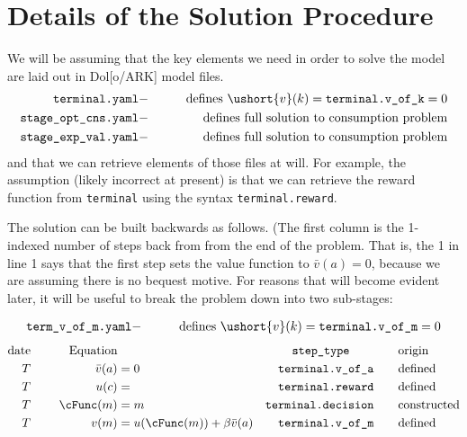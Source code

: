 \documentclass[\econtexRoot/BufferStockTheory]{subfiles}
\newcommand{\EOP}{\bar}
\newcommand{\MOP}{}
\newcommand{\BOP}{\ushort}
\begin{document}

\section{Details of the Solution Procedure}\label{sec:ApndxSolutionSteps}

\makeatletter
\newcommand{\leqnomode}{\tagsleft@true}
\newcommand{\reqnomode}{\tagsleft@false}
\renewcommand\tagform@[1]{\maketag@@@{\ignorespaces#1\unskip\@@italiccorr}}
\makeatother
\leqnomode
\small

We will be assuming that the key elements we need in order to solve the model are laid out in Dol[o/ARK] model files.
\begin{align*}
  \texttt{terminal.yaml} & - & \qquad \text{defines }\BOP{v}(k)=\texttt{terminal.v\_of\_k}=0
 \\ \texttt{stage\_opt\_cns.yaml} & - & \qquad \text{defines full solution to consumption problem}
 \\ \texttt{stage\_exp\_val.yaml} & - & \qquad \text{defines full solution to consumption problem}
\end{align*}
and that we can retrieve elements of those files at will.  For example, the assumption (likely incorrect at present) is that we can retrieve the reward function from \texttt{terminal} using the syntax \texttt{terminal.reward}.

\pagebreak
The solution can be built backwards as follows.  (The first column is the 1-indexed number of steps back from from the end of the problem. That is, the 1 in line 1 says that the first step sets the value function to $\EOP{v}(a)=0$, because we are assuming there is no bequest motive.
For reasons that will become evident later, it will be useful to break the problem down into two sub-stages:


\begin{align*}
  \texttt{term\_v\_of\_m.yaml} & - & \qquad \text{defines }\BOP{v}(k)=\texttt{terminal.v\_of\_m}=0
\end{align*}
\begin{alignat}{3}
\text{date} &      &   \notag \text{Equation} & \qquad                       & \qquad \texttt{step\_type} \qquad & \qquad \text{origin}
\\ T        & ~~~~ &   \EOP{v}(a)             & = 0                          & \texttt{terminal.v\_of\_a}        & \qquad \text{defined}
\\ T        & ~~~~ &   u(c)                   & =                            & \texttt{terminal.reward}          & \qquad \text{defined}
\\ T        & ~~~~ &   \cFunc(m)                   & = m                          & \texttt{terminal.decision}        & \qquad \text{constructed} \label{step:cFuncmake}
\\ T        & ~~~~ & \MOP{v}(m)               & = u(\cFunc(m)) + \beta \EOP{v}(a) & \texttt{terminal.v\_of\_m}        & \qquad \text{defined}
\end{alignat}
\end{document}
